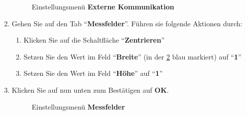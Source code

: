 \begin{enumerate}
\begin{figure}[t]
		\caption{Einstellungsmenü \textbf{Externe Kommunikation}}
		\label{fig:install_kommunikation}
	\end{figure}
	\item Gehen Sie auf den Tab \enquote{\textbf{Messfelder}}. Führen sie folgende Aktionen durch:
	\begin{enumerate}
		\item Klicken Sie auf die Schaltfläche \enquote{\textbf{Zentrieren}}
		\item Setzen Sie den Wert im Feld \enquote{\textbf{Breite}} (in der \cref{fig:install_messfeld} blau markiert) auf \enquote{\textbf{1}}
		\item Setzen Sie den Wert im Feld \enquote{\textbf{Höhe}} auf \enquote{\textbf{1}}
	\end{enumerate}
	\item Klicken Sie auf nun unten zum Bestätigen auf \textbf{OK}.
	\begin{figure}[H]
		\centering
		\caption{Einstellungsmenü \textbf{Messfelder}}
		\label{fig:install_messfeld}
	\end{figure}
\end{enumerate}


